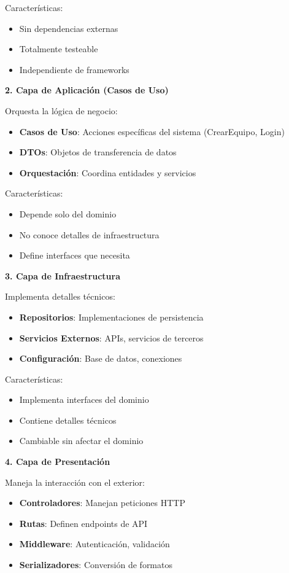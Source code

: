 \documentclass[12pt,a4paper]{article}
\begin{document}
Características:
\begin{itemize}
    \item Sin dependencias externas
    \item Totalmente testeable
    \item Independiente de frameworks
\end{itemize}

\textbf{2. Capa de Aplicación (Casos de Uso)}

Orquesta la lógica de negocio:
\begin{itemize}
    \item \textbf{Casos de Uso}: Acciones específicas del sistema (CrearEquipo, Login)
    \item \textbf{DTOs}: Objetos de transferencia de datos
    \item \textbf{Orquestación}: Coordina entidades y servicios
\end{itemize}

Características:
\begin{itemize}
    \item Depende solo del dominio
    \item No conoce detalles de infraestructura
    \item Define interfaces que necesita
\end{itemize}

\textbf{3. Capa de Infraestructura}

Implementa detalles técnicos:
\begin{itemize}
    \item \textbf{Repositorios}: Implementaciones de persistencia
    \item \textbf{Servicios Externos}: APIs, servicios de terceros
    \item \textbf{Configuración}: Base de datos, conexiones
\end{itemize}

Características:
\begin{itemize}
    \item Implementa interfaces del dominio
    \item Contiene detalles técnicos
    \item Cambiable sin afectar el dominio
\end{itemize}

\textbf{4. Capa de Presentación}

Maneja la interacción con el exterior:
\begin{itemize}
    \item \textbf{Controladores}: Manejan peticiones HTTP
    \item \textbf{Rutas}: Definen endpoints de API
    \item \textbf{Middleware}: Autenticación, validación
    \item \textbf{Serializadores}: Conversión de formatos
\end{itemize}
\end{document}
